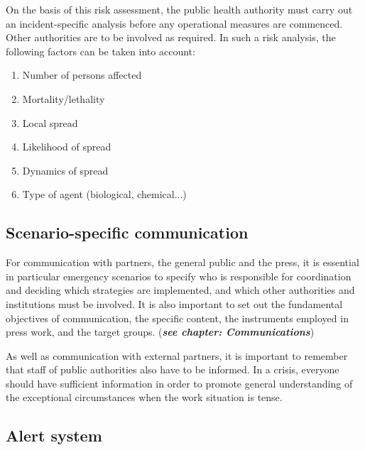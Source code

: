 \documentclass{article}
\begin{document}
On the basis of this risk assessment, the public health authority must carry out an incident-specific analysis before any operational measures are commenced. Other authorities are to be involved as required. In such a risk analysis, the following factors can be taken into account:

\begin{enumerate}
\item Number of persons affected


\item Mortality/lethality


\item Local spread


\item Likelihood of spread


\item Dynamics of spread


\item Type of agent (biological, chemical...)


\end{enumerate}

\subsection{Scenario-specific communication}\label{H1775411}



For communication with partners, the general public and the press, it is essential in particular emergency scenarios to specify who is responsible for coordination and deciding which strategies are implemented, and which other authorities and institutions must be involved. It is also important to set out the fundamental objectives of communication, the specific content, the instruments employed in press work, and the target groups. (\emph{\textbf{see chapter: Communications}})


As well as communication with external partners, it is important to remember that staff of public authorities also have to be informed. In a crisis, everyone should have sufficient information in order to promote general understanding of the exceptional circumstances when the work situation is tense.


\subsection{Alert system}\label{H26654}
\end{document}
